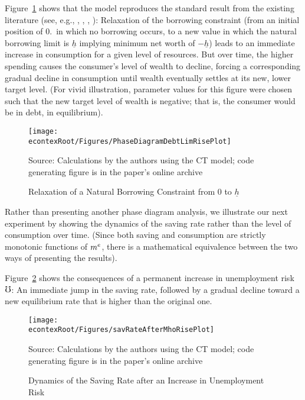 \documentclass[titlepage]{\econtex}
\begin{document}
Figure~\ref{fig:PhaseDiagramDebtLimRise} shows that the model reproduces the standard result from the existing literature (see, e.g., \cite{carroll:atheoryjep}, \cite{mue07}, \cite{glLiq}, \cite{hall:slump}): Relaxation of the borrowing constraint (from an initial position of 0.\ in which no borrowing occurs, to a new value in which the natural borrowing limit is $\underline{h}$ implying minimum net worth of $-\underline{h}$) leads to an immediate increase in consumption for a given level of resources.  But over time, the higher spending causes the consumer's level of wealth to decline, forcing a corresponding gradual decline in consumption until wealth eventually settles at its new, lower target level.  (For vivid illustration, parameter values for this figure were chosen such that
the new target level of wealth is negative; that is, the consumer would be in debt, in equilibrium).

\hypertarget{PhaseDiagramDebtLimRise}{}
\begin{figure}
\caption{Relaxation of a Natural Borrowing Constraint from 0 to $\underline{h}$}
\texttt{[image: \\econtexRoot/Figures/PhaseDiagramDebtLimRisePlot]}
\label{fig:PhaseDiagramDebtLimRise}

\tiny Source: Calculations by the authors using the CT  model; code generating figure is in the paper's online archive
\end{figure}

Rather than presenting another phase diagram analysis, we
illustrate our next experiment by showing the dynamics of the
saving rate rather than the level of consumption over time.  (Since
both saving and consumption are strictly monotonic functions of $m^{e}$,
there is a mathematical equivalence between the two ways of presenting
the results).

Figure~\ref{fig:savRateAfterMhoRisePlot} shows the consequences of a
permanent increase in unemployment risk $\mho$: An immediate jump in
the saving rate, followed by a gradual decline toward a new
equilibrium rate that is higher than the original one.


\hypertarget{savRateAfterMhoRisePlot}{}
\begin{figure}
\caption{Dynamics of the Saving Rate after an Increase in Unemployment Risk}
\texttt{[image: \\econtexRoot/Figures/savRateAfterMhoRisePlot]}
\label{fig:savRateAfterMhoRisePlot}

\tiny Source: Calculations by the authors using the CT model; code generating figure is in the paper's online archive
\end{figure}
\end{document}
